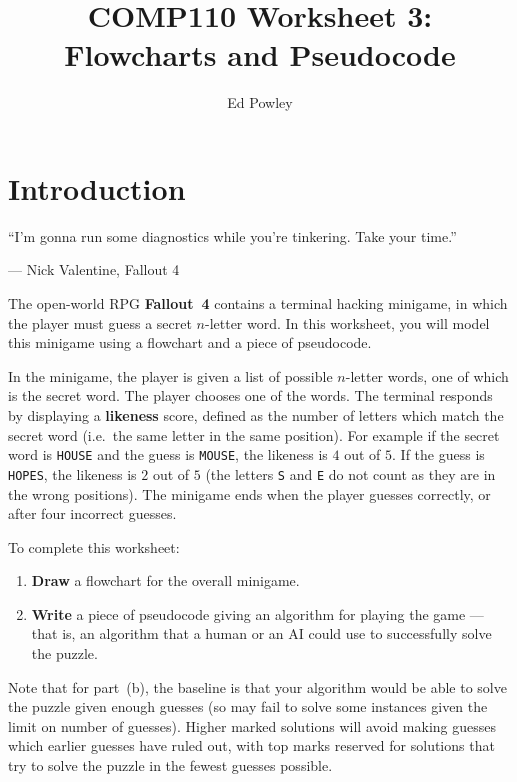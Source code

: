 \documentclass{../../../fal_assignment}
\title{COMP110 Worksheet 3: Flowcharts and Pseudocode}
\author{Ed Powley}
\begin{document}
\maketitle

\section*{Introduction}

\begin{marginquote}
``I'm gonna run some diagnostics while you're tinkering. Take your time.''

--- Nick Valentine, Fallout 4
\end{marginquote}

The open-world RPG \textbf{Fallout~4} contains a terminal hacking minigame, in which
the player must guess a secret $n$-letter word.
In this worksheet, you will model this minigame using a flowchart and a piece of pseudocode.

In the minigame, the player is given a list of possible $n$-letter words, one of which is the secret word.
The player chooses one of the words.
The terminal responds by displaying a \textbf{likeness} score,
defined as the number of letters which match the secret word (i.e.\ the same letter in the same position).
For example if the secret word is \texttt{HOUSE} and the guess is \texttt{MOUSE}, the likeness is $4$ out of $5$.
If the guess is \texttt{HOPES}, the likeness is $2$ out of $5$
(the letters \texttt{S} and \texttt{E} do not count as they are in the wrong positions).
The minigame ends when the player guesses correctly, or after four incorrect guesses.

To complete this worksheet:
\begin{enumerate}[label=(\alph*)]
	\item \textbf{Draw} a flowchart for the overall minigame.
	\item \textbf{Write} a piece of pseudocode giving an algorithm for playing the game
		--- that is, an algorithm that a human or an AI could use to successfully solve the puzzle.
\end{enumerate}

Note that for part~(b), the baseline is that your algorithm would be able to solve the puzzle given enough guesses (so may fail to solve some instances given the limit on number of guesses).
Higher marked solutions will avoid making guesses which earlier guesses have ruled out,
with top marks reserved for solutions that try to solve the puzzle in the fewest guesses possible.
\end{document}
